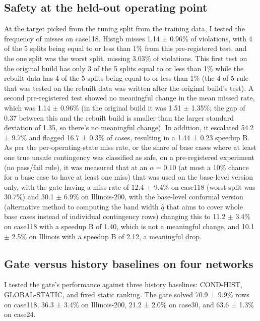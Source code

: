 \documentclass[12pt]{article}
\begin{document}
\subsection{Safety at the held-out operating point}
At the target picked from the tuning split from the training data, I tested the frequency of misses on case118. Histgb misses 1.14 ± 0.96\% of violations, with 4 of the 5 splits being equal to or less than 1\% from this pre-registered test, and the one split was the worst split, missing 3.03\% of violations. This first test on the original build has only 3 of the 5 splits equal to or less than 1\% while the rebuilt data has 4 of the 5 splits being equal to or less than 1\% (the 4-of-5 rule that was tested on the rebuilt data was written after the original build's test). A second pre-registered test showed no meaningful change in the mean missed rate, which was 1.14 $\pm$ 0.96\% (in the original build it was 1.51 $\pm$ 1.35\%; the gap of 0.37 between this and the rebuilt build is smaller than the larger standard deviation of 1.35, so there's no meaningful change). In addition, it escalated 54.2 ± 9.7\% and flagged 16.7 ± 0.3\% of cases, resulting in a 1.44 ± 0.23 speedup B. As per the per-operating-state miss rate, or the share of base cases where at least one true unsafe contingency was classified as safe, on a pre-registered experiment (no pass/fail rule), it was measured that at an $\alpha = 0.10$ (at most a 10\% chance for a base case to have at least one miss) that was used on the base-level version only, with the gate having a miss rate of 12.4 $\pm$ 9.4\% on case118 (worst split was 30.7\%) and 30.1 $\pm$ 6.9\% on Illinois-200, with the base-level conformal version (alternative method to computing the band width $\hat{q}$ that aims to cover whole base cases instead of individual contingency rows) changing this to 11.2 $\pm$ 3.4\% on case118 with a speedup B of 1.40, which is not a meaningful change, and 10.1 $\pm$ 2.5\% on Illinois with a speedup B of 2.12, a meaningful drop.

\subsection{Gate versus history baselines on four networks}
\label{subsec:gatevsbaslines}
I tested the gate's performance against three history baselines: COND-HIST, GLOBAL-STATIC, and fixed static ranking. The gate solved 70.9 ± 9.9\% rows on case118, 36.3 ± 3.4\% on Illinois-200, 21.2 ± 2.0\% on case30, and 63.6 ± 1.3\% on case24.
\end{document}
